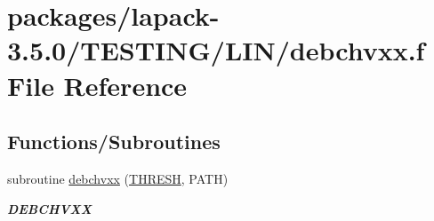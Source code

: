 \hypertarget{debchvxx_8f}{}\section{packages/lapack-\/3.5.0/\+T\+E\+S\+T\+I\+N\+G/\+L\+I\+N/debchvxx.f File Reference}
\label{debchvxx_8f}
\subsection*{Functions/\+Subroutines}
\begin{DoxyCompactItemize}
\item 
subroutine \hyperlink{group__double__lin_gad92e7ab1396e44f94e174a8dd762391e}{debchvxx} (\hyperlink{zlaqgs_8c_a0656018abfc9fa2821827415f5d5ea57}{T\+H\+R\+E\+S\+H}, P\+A\+T\+H)
\begin{DoxyCompactList}\small\item\em {\bfseries D\+E\+B\+C\+H\+V\+X\+X} \end{DoxyCompactList}\end{DoxyCompactItemize}

